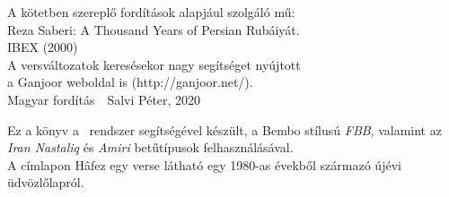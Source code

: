 \thispagestyle{empty}
\begin{center}
  A kötetben szereplő fordítások alapjául szolgáló mű:\\
  \bigskip
  Reza Saberi: A Thousand Years of Persian Rubáiyát.\\
  IBEX (2000)\\
  \bigskip
  A versváltozatok keresésekor nagy segítséget nyújtott\\
  a Ganjoor weboldal is (http://ganjoor.net/).\\
  \bigskip
  Magyar fordítás\ \textcopyright\ Salvi Péter, 2020
\end{center}
\vspace*{\fill}
{\small Ez a könyv a \XeLaTeX\ rendszer segítségével készült, a Bembo stílusú \emph{FBB},
  valamint az \emph{Iran Nastaliq} és \emph{Amiri} betűtípusok felhasználásával.\\
  A címlapon Hâfez egy verse látható egy 1980-as évekből származó újévi üdvözlőlapról.
}

